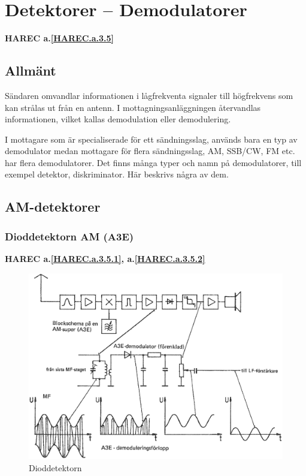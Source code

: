 \section{Detektorer -- Demodulatorer}
\textbf{HAREC a.\ref{HAREC.a.3.5}\label{myHAREC.a.3.5}}
\label{detektorer}

\subsection{Allmänt}

Sändaren omvandlar informationen i lågfrekventa signaler till
högfrekvens som kan strålas ut från en antenn.
I mottagningsanläggningen återvandlas informationen, vilket kallas
demodulation eller demodulering.

I mottagare som är specialiserade för ett sändningsslag, används bara en typ av
demodulator medan mottagare för flera sändningsslag, AM, SSB/CW, FM etc. har
flera demodulatorer.
Det finns många typer och namn på demodulatorer, till exempel detektor, diskriminator.
Här beskrivs några av dem.

\subsection{AM-detektorer}

\subsubsection{Dioddetektorn AM (A3E)}
\textbf{HAREC
  a.\ref{HAREC.a.3.5.1}\label{myHAREC.a.3.5.1},
  a.\ref{HAREC.a.3.5.2}\label{myHAREC.a.3.5.2}
}

\begin{figure}
\includegraphics[width=\textwidth]{images/cropped_pdfs/bild_2_3-55.pdf}
\caption{Dioddetektorn}
\label{fig:BildII3-55}
\end{figure}


